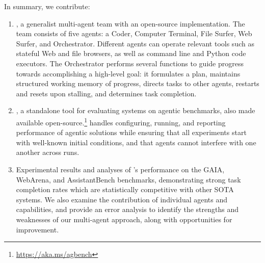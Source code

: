In summary, we contribute: 
\begin{enumerate}
    \item \emph{\team}, a generalist multi-agent team with an open-source implementation. The team consists of five agents: a Coder, Computer Terminal, File Surfer, Web Surfer, and Orchestrator. Different agents can operate relevant tools such as stateful Web and file browsers, as well as command line and Python code executors. The Orchestrator  performs several functions to guide progress towards accomplishing a high-level goal: it formulates a plan, maintains structured working memory of progress, directs tasks to other agents, restarts and resets upon stalling, and determines task completion. 
    \item \emph{\agbench{}}, a standalone tool for evaluating systems on agentic benchmarks, also made available open-source.\footnote{\url{https://aka.ms/agbench}} \agbench{} handles  configuring, running, and reporting performance of agentic solutions while ensuring that all experiments start with well-known initial conditions, and that agents cannot interfere with one another across runs. 
    \item Experimental results and analyses of \team's performance on the GAIA, WebArena, and AssistantBench benchmarks, demonstrating strong task completion rates which are statistically competitive with other SOTA systems. We also examine the contribution of individual agents and capabilities, and provide an error analysis to identify the strengths and weaknesses of our multi-agent approach, along with opportunities for improvement.
\end{enumerate}